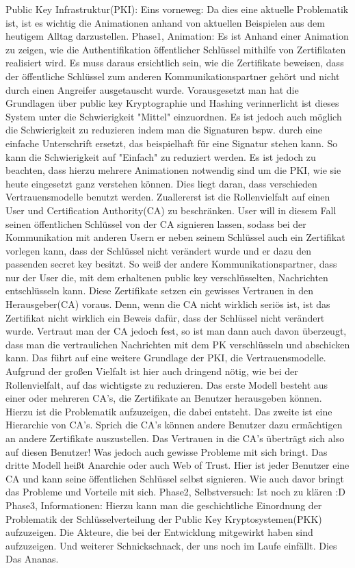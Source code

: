 \documentclass{article}
\begin{document}
Public Key Infrastruktur(PKI):
Eins vorneweg: Da dies eine aktuelle Problematik ist, ist es wichtig die Animationen anhand von aktuellen Beispielen aus dem heutigem Alltag darzustellen.
Phase1, Animation:
Es ist Anhand einer Animation zu zeigen, wie die Authentifikation öffentlicher Schlüssel mithilfe von Zertifikaten realisiert wird. Es muss daraus ersichtlich sein, wie die Zertifikate beweisen, dass der öffentliche Schlüssel zum anderen Kommunikationspartner gehört und nicht durch einen Angreifer ausgetauscht wurde. 
Vorausgesetzt man hat die Grundlagen über public key Kryptographie und Hashing verinnerlicht ist dieses System unter die Schwierigkeit "Mittel" einzuordnen. Es ist jedoch auch möglich die Schwierigkeit zu reduzieren indem man die Signaturen bspw. durch eine einfache Unterschrift ersetzt, das beispielhaft für eine Signatur stehen kann. So kann die Schwierigkeit auf "Einfach" zu reduziert werden.
Es ist jedoch zu beachten, dass hierzu mehrere Animationen notwendig sind um die PKI, wie sie heute eingesetzt ganz verstehen können. Dies liegt daran, dass verschieden Vertrauensmodelle benutzt werden. Zuallererst ist die Rollenvielfalt auf einen User und Certification Authority(CA) zu beschränken. User will in diesem Fall seinen öffentlichen Schlüssel von der CA signieren lassen, sodass bei der Kommunikation mit anderen Usern er neben seinem Schlüssel auch ein Zertifikat vorlegen kann, dass der Schlüssel nicht verändert wurde und er dazu den passenden secret key besitzt. So weiß der andere Kommunikationspartner, dass nur der User die, mit dem erhaltenen public key verschlüsselten, Nachrichten entschlüsseln kann. Diese Zertifikate setzen ein gewisses Vertrauen in den Herausgeber(CA) voraus. Denn, wenn die CA nicht wirklich seriös ist, ist das Zertifikat nicht wirklich ein Beweis dafür, dass der Schlüssel nicht verändert wurde. Vertraut man der CA jedoch fest, so ist man dann auch davon überzeugt, dass man die vertraulichen Nachrichten mit dem PK verschlüsseln und abschicken kann. Das führt auf eine weitere Grundlage der PKI, die Vertrauensmodelle. Aufgrund der großen Vielfalt ist hier auch dringend nötig, wie bei der Rollenvielfalt, auf das wichtigste zu reduzieren.
Das erste Modell besteht aus einer oder mehreren CA's, die Zertifikate an Benutzer herausgeben können. Hierzu ist die Problematik aufzuzeigen, die dabei entsteht.
Das zweite ist eine Hierarchie von CA's. Sprich die CA's können andere Benutzer dazu ermächtigen an andere Zertifikate auszustellen. Das Vertrauen in die CA's überträgt sich also auf diesen Benutzer! Was jedoch auch gewisse Probleme mit sich bringt.
Das dritte Modell heißt Anarchie oder auch Web of Trust. Hier ist jeder Benutzer eine CA und kann seine öffentlichen Schlüssel selbst signieren. Wie auch davor bringt das Probleme und Vorteile mit sich.
Phase2, Selbstversuch:
Ist noch zu klären :D
Phase3, Informationen:
Hierzu kann man die geschichtliche Einordnung der Problematik der Schlüsselverteilung der Public Key Kryptosystemen(PKK) aufzuzeigen. Die Akteure, die bei der Entwicklung mitgewirkt haben sind aufzuzeigen. Und weiterer Schnickschnack, der uns noch im Laufe einfällt. Dies Das Ananas.
\end{document}
